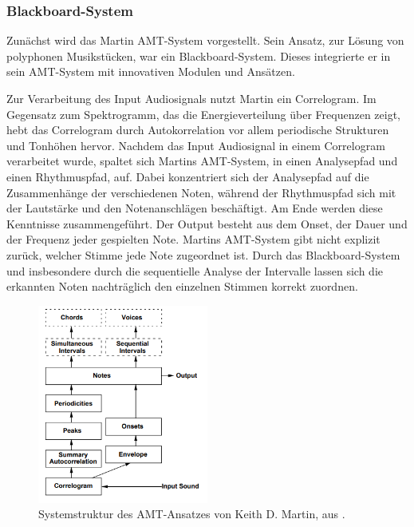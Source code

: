 \subsubsection{Blackboard-System}
Zunächst wird das Martin AMT-System \cite{Martin1996} vorgestellt.
Sein Ansatz, zur Lösung von polyphonen Musikstücken, war ein Blackboard-System.
Dieses integrierte er in sein AMT-System mit innovativen Modulen und Ansätzen.

Zur Verarbeitung des Input Audiosignals nutzt Martin ein Correlogram.
Im Gegensatz zum Spektrogramm, das die Energieverteilung über Frequenzen zeigt,
hebt das Correlogram durch Autokorrelation vor allem periodische Strukturen und Tonhöhen hervor.
Nachdem das Input Audiosignal in einem Correlogram verarbeitet wurde,
spaltet sich Martins AMT-System, in einen Analysepfad und einen Rhythmuspfad, auf.
Dabei konzentriert sich der Analysepfad auf die Zusammenhänge der verschiedenen Noten,
während der Rhythmuspfad sich mit der Lautstärke und den Notenanschlägen beschäftigt.
Am Ende werden diese Kenntnisse zusammengeführt.
Der Output besteht aus dem Onset, der Dauer und der Frequenz jeder gespielten Note.
Martins AMT-System gibt nicht explizit zurück, welcher Stimme jede Note zugeordnet ist.
Durch das Blackboard-System und insbesondere durch die sequentielle Analyse der Intervalle
lassen sich die erkannten Noten nachträglich den einzelnen Stimmen korrekt zuordnen.

\begin{figure}[H]
    \centering
    \includegraphics[width=0.5\textwidth]{Graphics/Martin1996Structure}
    \caption[Systemstruktur nach Martin]{Systemstruktur des AMT-Ansatzes von Keith D. Martin, aus  \cite{Martin1996}.}
    \label{fig:martin-structure}
\end{figure}


